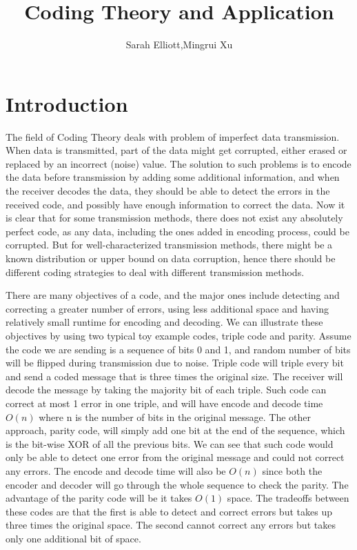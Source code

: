 \documentclass{article}
\author{Sarah Elliott,Mingrui Xu}
\title{Coding Theory and Application}
\begin{document}
\maketitle
\tableofcontents
\newpage

\section{Introduction}
The field of Coding Theory deals with problem of imperfect data transmission. When data is transmitted, part of the data might get corrupted, either erased or replaced by an incorrect (noise) value. The solution to such problems is to encode the data before transmission by adding some additional information, and when the receiver decodes the data, they should be able to detect the errors in the received code, and possibly have enough information to correct the data. Now it is clear that for some transmission methods, there does not exist any absolutely perfect code, as any data, including the ones added in encoding process, could be corrupted. But for well-characterized transmission methods, there might be a known distribution or upper bound on data corruption, hence there should be different coding strategies to deal with different transmission methods.

There are many objectives of a code, and the major ones include detecting and correcting a greater number of errors, using less additional space and having relatively small runtime for encoding and decoding. We can illustrate these objectives by using two typical toy example codes, triple code and parity. Assume the code we are sending is a sequence of bits 0 and 1, and random number of bits will be flipped during transmission due to noise. Triple code will triple every bit and send a coded message that is three times the original size. The receiver will decode the message by taking the majority bit of each triple. Such code can correct at most 1 error in one triple, and will have encode and decode time $O(n)$ where n is the number of bits in the original message. The other approach, parity code, will simply add one bit at the end of the sequence, which is the bit-wise XOR of all the previous bits. We can see that such code would only be able to detect one error from the original message and could not correct any errors. The encode and decode time will also be $O(n)$ since both the encoder and decoder will go through the whole sequence to check the parity. The advantage of the parity code will be it takes $O(1)$ space. The tradeoffs between these codes are that the first is able to detect and correct errors but takes up three times the original space. The second cannot correct any errors but takes only one additional bit of space.
\end{document}
